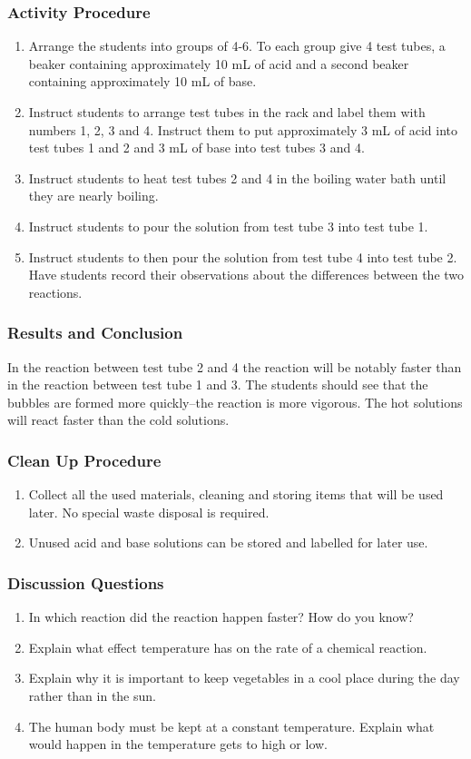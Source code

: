 \subsubsection*{Activity Procedure}
\begin{enumerate}
\item{Arrange the students into groups of 4-6. To each group give 4 test tubes, a beaker containing approximately 10 mL of acid and a second beaker containing approximately 10 mL of base.}
\item{Instruct students to arrange test tubes in the rack and label them with numbers 1, 2, 3 and 4. Instruct them to put approximately 3 mL of acid into test tubes 1 and 2 and 3 mL of base into test tubes 3 and 4.}
\item{Instruct students to heat test tubes 2 and 4 in the boiling water bath until they are nearly boiling.}
\item{Instruct students to pour the solution from test tube 3 into test tube 1.}
\item{Instruct students to then pour the solution from test tube 4 into test tube 2. Have students record their observations about the differences between the two reactions.}
\end{enumerate}

\subsubsection*{Results and Conclusion}
In the reaction between test tube 2 and 4 the reaction will be notably faster than in the reaction between test tube 1 and 3. The students should see that the bubbles are formed more quickly--the reaction is more vigorous. The hot solutions will react faster than the cold solutions.

\subsubsection*{Clean Up Procedure}
\begin{enumerate}
\item{Collect all the used materials, cleaning and storing items that will be used later. No special waste disposal is required.}
\item{Unused acid and base solutions can be stored and labelled for later use.}
\end{enumerate}

\subsubsection*{Discussion Questions}
\begin{enumerate}
\item{In which reaction did the reaction happen faster? How do you know?}
\item{Explain what effect temperature has on the rate of a chemical reaction.}
\item{Explain why it is important to keep vegetables in a cool place during the day rather than in the sun.}
\item{The human body must be kept at a constant temperature. Explain what would happen in the temperature gets to high or low.}
\end{enumerate}

